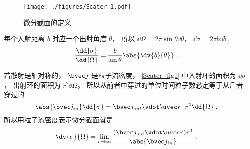 
\begin{issues}
\issueDraft
\end{issues}



\begin{figure}[ht]
\centering
\texttt{[image: ./figures/Scater\_1.pdf]}
\caption{微分截面的定义} \label{Scater_fig1}
\end{figure}

每个入射距离 $b$ 对应一个出射角度 $\theta$， 所以 $\dd\Omega = 2\pi \sin\theta \dd{\theta}$， $\dd{\sigma} = 2\pi b \dd{b}~,$
\begin{equation}
\frac{\dd{\sigma}}{\dd{\Omega}} = \frac{b}{\sin\theta} \abs{\dv{b}{\theta}}~.
\end{equation}

若散射是轴对称的， $\bvec j$ 是粒子流密度， \autoref{Scater_fig1} 中入射环的面积为 $\dd{\sigma}$， 出射环的面积为 $r^2\dd{\Omega}$。 所以从前者中穿过的单位时间粒子数必定等于从后者穿过的
\begin{equation}
\abs{\bvec j_{in}}\dd{\sigma} = \bvec j_{out} \vdot \uvec r\ \ r^2\dd{\Omega}~,
\end{equation}
所以用粒子流密度表示微分截面就是
\begin{equation}
\dv{\sigma}{\Omega} = \lim_{r\to\infty} \frac{(\bvec j_{out} \vdot \uvec r) r^2}{\abs{\bvec j_{in}}}~.
\end{equation}
